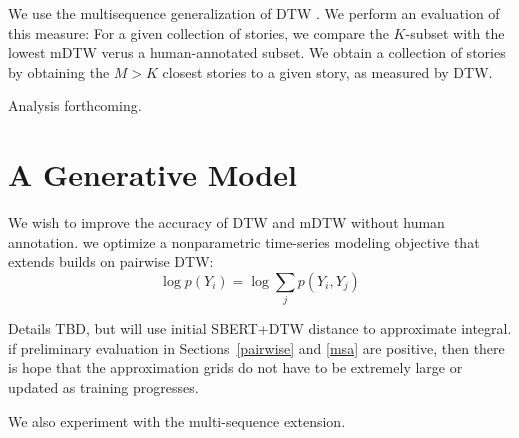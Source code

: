 \documentclass{article}
\begin{document}
We use the multisequence generalization of DTW \citep{zhou2016gctw}.
We perform an evaluation of this measure:
For a given collection of stories, we compare the $K$-subset with the lowest mDTW
verus a human-annotated subset.
We obtain a collection of stories by obtaining the $M > K$ closest stories to a given story,
as measured by DTW.

Analysis forthcoming.

\section{A Generative Model}
We wish to improve the accuracy of DTW and mDTW without human annotation.
we optimize a nonparametric time-series modeling objective that extends builds on
pairwise DTW:
\begin{equation*}
\log p(Y_i) = \log \sum_j p(Y_i, Y_j)
\end{equation*}

Details TBD, but will use initial SBERT+DTW distance to approximate integral.
if preliminary evaluation in Sections~\ref{pairwise} and \ref{msa}
are positive, then there is hope that the approximation
grids do not have to be extremely large or updated as training progresses.

We also experiment with the multi-sequence extension.

\newpage


\end{document}
